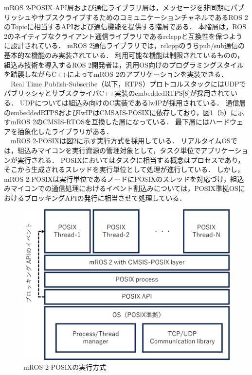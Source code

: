 \documentclass[11pt]{ujarticle}
\begin{document}
mROS 2-POSIX API層および通信ライブラリ層は，メッセージを非同期にパブリッシュやサブスクライブするためのコミュニケーションチャネルであるROS 2のTopicに相当するAPIおよび通信機能を提供する階層である．
本階層は，ROS 2のネイティブなクライアント通信ライブラリであるrclcppと互換性を保つように設計されている．
mROS 2通信ライブラリでは，rclcppのうちpub/sub通信の基本的な機能のみ実装されている．
利用可能な機能は制限されているものの，組込み技術を導入するROS 2開発者は，汎用OS向けのプログラミングスタイルを踏襲しながらC++によってmROS 2のアプリケーションを実装できる．
\\　Real Time Publish-Subscribe（以下，RTPS）プロトコルスタックにはUDPでパブリッシャとサブスクライバC++実装のembeddedRTPS[8]が採用されている．
UDPについては組込み向けのC実装であるlwIPが採用されている．
通信層のembeddedRTPSおよびlwIPはCMSAIS-POSIXに依存しており，図1（b）に示すmROS 2のCMSIS-RTOSを互換した層になっている．
最下層にはハードウェアを抽象化したライブラリがある．
\\　mROS 2-POSIXは図2に示す実行方式を採用している．
リアルタイムOSでは，組込みマイコンを実行資源の管理対象として，タスク単位でアプリケーションが実行される．
POSIXにおいてはタスクに相当する概念はプロセスであり，そこから生成されるスレッドを実行単位として処理が進行している．
しかし，mROS 2-POSIXは実行単位であるノードにPOSIXのスレッドを対応づけ，組込みマイコンでの通信処理におけるイベント割込みについては，POSIX準拠OSにおけるブロッキングAPIの発行に相当させて処理している．
\begin{figure}[t]
	\centering
	\includegraphics[width=0.9\linewidth]{./src/fig2_execution_structure.png}
	\caption{mROS 2-POSIXの実行方式}
  \label{fig:arch}
\end{figure}
\end{document}
